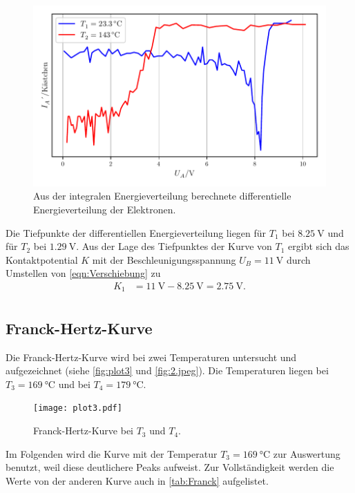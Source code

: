 \begin{figure}[H]
  \centering
  \includegraphics[width=\textwidth]{build/plot2.pdf}
  \caption {Aus der integralen Energieverteilung berechnete differentielle Energieverteilung der Elektronen.}
  \label{fig:plot2}
\end{figure}
Die Tiefpunkte der differentiellen Energieverteilung liegen für $T_1$ bei $\qty{8.25}{\volt}$ und für $T_2$ bei $\qty{1.29}{\volt}$.
Aus der Lage des Tiefpunktes der Kurve von $T_1$ ergibt sich das Kontaktpotential $K$ mit der Beschleunigungsspannung $U_B= \qty{11}{\volt}$
durch Umstellen von \autoref{eqn:Verschiebung} zu
\begin{align*}
  K_1 &= \qty{11}{\volt}-\qty{8.25}{\volt} = \qty{2.75}{\volt}.\\
\end{align*}

\subsection{Franck-Hertz-Kurve} %
\label{sub:Franck-Hertz-Kurve}
Die Franck-Hertz-Kurve wird bei zwei Temperaturen untersucht und aufgezeichnet (siehe \autoref{fig:plot3} und \autoref{fig:2.jpeg}). 
Die Temperaturen liegen bei $T_3= \qty{169}{\celsius}$ und bei $T_4= \qty{179}{\celsius}$.

\begin{figure}[H]
  \centering
  \texttt{[image: plot3.pdf]}
  \caption{Franck-Hertz-Kurve bei $T_3$ und $T_4$.}
  \label{fig:plot3}
\end{figure}

Im Folgenden wird die Kurve mit der Temperatur $T_3 = \qty{169}{\celsius}$ zur Auswertung benutzt, weil diese deutlichere Peaks aufweist. Zur Vollständigkeit
werden die Werte von der anderen Kurve auch in \autoref{tab:Franck} aufgelistet.

